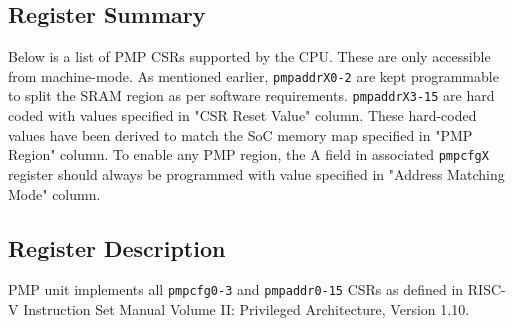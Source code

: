 \documentclass[main\_\_EN.tex]{subfiles}
\begin{document}

\hypertarget{riscvcpu-pmp-reg-summ}{}
\subsection{Register Summary}
\label{sec:riscvcpu-pmp-reg-summ}


Below is a list of PMP CSRs supported by the CPU. These are only accessible from machine-mode. As mentioned earlier, \texttt{pmpaddrX0-2} are kept programmable to split the SRAM region as per software requirements. \texttt{pmpaddrX3-15} are hard coded with values specified in "CSR Reset Value" column.  These hard-coded values have been derived to match the SoC memory map specified in "PMP Region" column. To enable any PMP region, the A field in associated \texttt{pmpcfgX} register should always be programmed with value specified in "Address Matching Mode" column.




\subsection{Register Description}
\label{sec:riscvcpu-pmp-reg-desc}

PMP unit implements all \texttt{pmpcfg0-3} and \texttt{pmpaddr0-15} CSRs as defined in RISC-V Instruction Set Manual Volume II: Privileged Architecture, Version 1.10.
\end{document}
